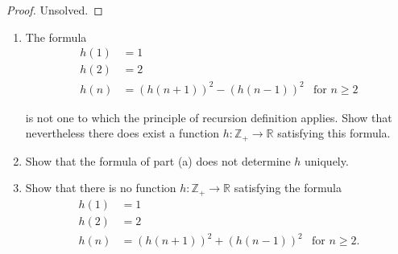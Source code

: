 \begin{proof}
    Unsolved.
\end{proof}

\begin{exercise}\label{chapter1:section7:exercise9}
    \begin{enumerate}[label={(\alph*)}]
        \item The formula
              \begin{align*}
                  h(1) & = 1                                                      \\
                  h(2) & = 2                                                      \\
                  h(n) & = {(h(n+1))}^{2} - {(h(n-1))}^{2} & \text{for $n\geq 2$}
              \end{align*}

              is not one to which the principle of recursion definition applies. Show that nevertheless there does exist a function $h: \mathbb{Z}_{+}\to\mathbb{R}$ satisfying this formula.
        \item Show that the formula of part (a) does not determine $h$ uniquely.
        \item Show that there is no function $h: \mathbb{Z}_{+}\to \mathbb{R}$ satisfying the formula
              \begin{align*}
                  h(1) & = 1                                                       \\
                  h(2) & = 2                                                       \\
                  h(n) & = {(h(n+1))}^{2} + {(h(n-1))}^{2} & \text{for $n\geq 2$.}
              \end{align*}
    \end{enumerate}
\end{exercise}

